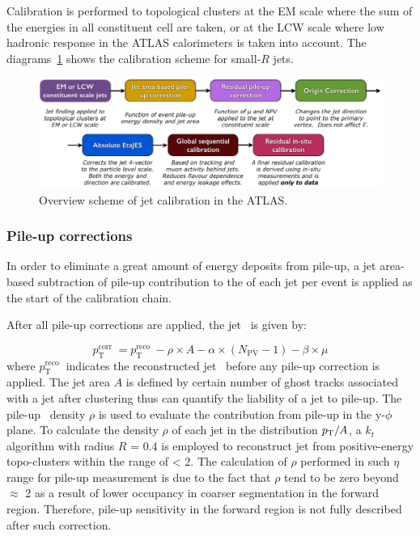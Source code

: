 Calibration is performed to topological clusters at the EM scale where the sum of the energies in all constituent cell are taken, or at the LCW scale where low hadronic response in the ATLAS calorimeters is taken into account. The diagrams~\ref{Fig.calib} shows the calibration scheme for small-$R$ jets.

\begin{figure}[htb] 
	\centering  
	\includegraphics[width=15cm]{./fig/calib.png}	\caption{Overview scheme of jet calibration in the ATLAS.}
	\label{Fig.calib}
\end{figure}

\subsubsection{Pile-up corrections}


In order to eliminate a great amount of energy deposits from pile-up, a jet area-based subtraction of pile-up contribution to the \pt of each jet per event is applied as the start of the calibration chain. 

After all pile-up corrections are applied, the jet \pt~is given by:

\begin{equation}
p_{\mathrm{T}}^{\text {corr }}=p_{\mathrm{T}}^{\text {reco }}-\rho \times A-\alpha \times\left(N_{\mathrm{PV}}-1\right)-\beta \times \mu
\end{equation}
where $p_{\mathrm{T}}^{\text {reco }}$ indicates the reconstructed jet \pt~before any pile-up correction is applied. The jet area $A$ is defined by certain number of ghost tracks associated with a jet after clustering thus can quantify the liability of a jet to pile-up.  The pile-up \pt~density $\rho$ is used to evaluate the contribution from pile-up in the y-$\phi$ plane. To calculate the density $\rho$ of each jet in the distribution $p_{\mathrm{T}}/A$, a $k_t$ algorithm with radius $R$ = 0.4 is employed to reconstruct jet from positive-energy topo-clusters within the range of \abseta < 2. The calculation of $\rho$ performed in such $\eta$ range for pile-up measurement is due to the fact that $\rho$ tend to be zero beyond \abseta~$\approx$ 2 as a result of lower occupancy in coarser segmentation in the forward region. Therefore, pile-up sensitivity in the forward region is not fully described after such correction.  

